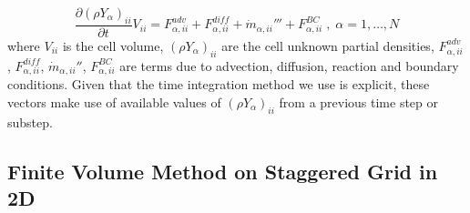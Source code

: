 %
\begin{equation}
\frac{\partial \left(\rho Y_\alpha \right)_{ii} }{\partial t} V_{ii}  = F^{adv}_{\alpha,ii} + F^{diff}_{\alpha,ii} + \dot{m}_{\alpha,ii}''' +  F^{BC}_{\alpha,ii} \; , \; \alpha=1,\dots,N \label{eq:discbal3}
\end{equation}
%
where $V_{ii}$ is the cell volume, $\left(\rho Y_\alpha \right)_{ii}$ are the cell unknown partial densities, 
$F^{adv}_{\alpha,ii}$, $F^{diff}_{\alpha,ii}$, $\dot{m}_{\alpha,ii}''$, $F^{BC}_{\alpha,ii}$ are terms due to advection, diffusion, reaction and boundary conditions. Given that the time integration method we use is explicit, these vectors make use of available values of $\left(\rho Y_\alpha \right)_{ii}$ from a previous time step or substep. 


\subsection{Finite Volume Method on Staggered Grid in 2D}

